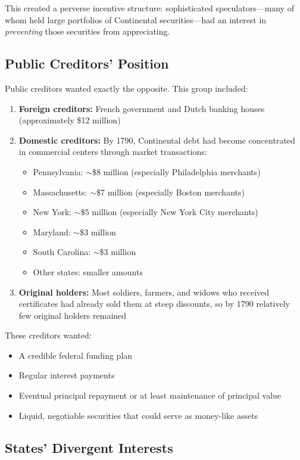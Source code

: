 \documentclass[12pt]{article}
\begin{document}
This created a perverse incentive structure: sophisticated speculators---many of whom held large portfolios of Continental securities---had an interest in \textit{preventing} those securities from appreciating.

\subsection{Public Creditors' Position}

Public creditors wanted exactly the opposite. This group included:

\begin{enumerate}
\item \textbf{Foreign creditors:} French government and Dutch banking houses (approximately \$12 million)
\item \textbf{Domestic creditors:} By 1790, Continental debt had become concentrated in commercial centers through market transactions:
\begin{itemize}
\item Pennsylvania: $\sim$\$8 million (especially Philadelphia merchants)
\item Massachusetts: $\sim$\$7 million (especially Boston merchants)  
\item New York: $\sim$\$5 million (especially New York City merchants)
\item Maryland: $\sim$\$3 million
\item South Carolina: $\sim$\$3 million
\item Other states: smaller amounts
\end{itemize}
\item \textbf{Original holders:} Most soldiers, farmers, and widows who received certificates had already sold them at steep discounts, so by 1790 relatively few original holders remained
\end{enumerate}

These creditors wanted:
\begin{itemize}
\item A credible federal funding plan
\item Regular interest payments
\item Eventual principal repayment or at least maintenance of principal value
\item Liquid, negotiable securities that could serve as money-like assets
\end{itemize}

\subsection{States' Divergent Interests}
\end{document}
